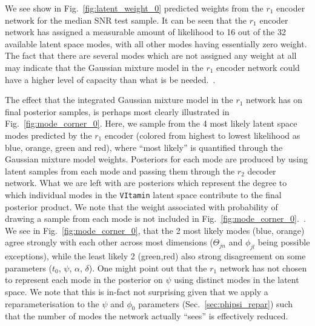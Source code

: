 %
%
We see show in Fig.~\ref{fig:latent_weight_0} predicted 
weights from the $r_1$ encoder network for the median \ac{SNR} 
test sample. It can be seen that the $r_1$ encoder network has assigned 
a measurable amount of likelihood to 16 out of the 32 available latent space 
modes, with all other 
modes having essentially zero weight. The fact that there are 
several modes which 
are not assigned any weight at all may 
indicate that the Gaussian mixture model in the $r_1$ encoder network could 
have a higher level of capacity than what is be needed.~. 

%
%
The effect that the integrated 
Gaussian mixture model in the $r_1$ network has on final posterior 
samples, is perhaps most clearly illustrated in
Fig.~\ref{fig:mode_corner_0}. 
Here, we sample from the 4 most likely latent space modes predicted by 
the $r_1$ encoder (colored from highest to lowest likelihood as blue, 
orange, green and red), where ``most likely'' is quantified through 
the Gaussian mixture model weights. Posteriors for each mode are 
produced by using latent samples from each mode and passing them 
through the $r_2$ decoder network. What we are left with are 
posteriors which represent the degree to which individual 
modes in the \texttt{VItamin} latent space contribute to the 
final posterior product. We note that the weight associated with 
probability of drawing a sample from each mode is not included in 
Fig.~\ref{fig:mode_corner_0}.~. 
We see in Fig.~\ref{fig:mode_corner_0}, that the 2 most likely modes 
(blue, orange) agree strongly with each other across most 
dimensions ($\Theta_{jn}$ and $\phi_{jl}$ being possible 
exceptions), while the least likely 2 (green,red) also strong 
disagreement on some parameters ($t_0$, $\psi$, $\alpha$, $\delta$). 
One might point out that the $r_1$ network has 
not chosen to represent each mode in the posterior on $\psi$ using 
distinct modes in the latent space. We note that this is in-fact not 
surprising given that we apply a reparameterisation to the 
$\psi$ and $\phi_0$ parameters (Sec.~\ref{sec:phipsi_repar}) such that 
the number of modes the network actually ``sees'' is effectively reduced.

